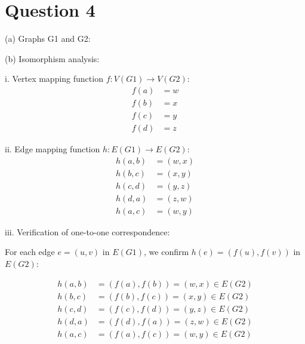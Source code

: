 \documentclass{article}
\begin{document}
\section*{Question 4}
(a) Graphs G1 and G2:


(b) Isomorphism analysis:

i. Vertex mapping function $f : V(G1) \rightarrow V(G2)$:
   \begin{align*}
   f(a) &= w \\
   f(b) &= x \\
   f(c) &= y \\
   f(d) &= z
   \end{align*}

ii. Edge mapping function $h : E(G1) \rightarrow E(G2)$:
    \begin{align*}
    h(a,b) &= (w,x) \\
    h(b,c) &= (x,y) \\
    h(c,d) &= (y,z) \\
    h(d,a) &= (z,w) \\
    h(a,c) &= (w,y)
    \end{align*}

iii. Verification of one-to-one correspondence:

For each edge $e = (u,v)$ in $E(G1)$, we confirm $h(e) = (f(u), f(v))$ in $E(G2)$:

\begin{align*}
h(a,b) &= (f(a), f(b)) = (w,x) \in E(G2) \\
h(b,c) &= (f(b), f(c)) = (x,y) \in E(G2) \\
h(c,d) &= (f(c), f(d)) = (y,z) \in E(G2) \\
h(d,a) &= (f(d), f(a)) = (z,w) \in E(G2) \\
h(a,c) &= (f(a), f(c)) = (w,y) \in E(G2)
\end{align*}
\end{document}
